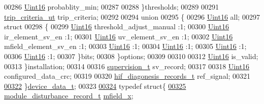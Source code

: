 \begin{DoxyCode}
00286         \hyperlink{a00004_aae7407b021d43f7193a81a58cfb3e297}{Uint16}                              probablity\_min;
00287 
00288         \}thresholds;
00289 
00291         \hyperlink{a00006_d0/d53/a00232}{trip\_criteria\_ut}                    trip\_criteria;
00292 
00294         \textcolor{keyword}{union}
00295         \{
00296            \hyperlink{a00004_aae7407b021d43f7193a81a58cfb3e297}{Uint16}                           all;
00297            \textcolor{keyword}{struct}
00298            \{
00299               \hyperlink{a00004_aae7407b021d43f7193a81a58cfb3e297}{Uint16}                        threshold\_adjust\_manual :1;
00300               \hyperlink{a00004_aae7407b021d43f7193a81a58cfb3e297}{Uint16}                        ir\_element\_sv\_en        :1;
00301               \hyperlink{a00004_aae7407b021d43f7193a81a58cfb3e297}{Uint16}                        uv\_element\_sv\_en        :1;
00302               \hyperlink{a00004_aae7407b021d43f7193a81a58cfb3e297}{Uint16}                        mfield\_element\_sv\_en    :1;
00303               \hyperlink{a00004_aae7407b021d43f7193a81a58cfb3e297}{Uint16}                                                :1;
00304               \hyperlink{a00004_aae7407b021d43f7193a81a58cfb3e297}{Uint16}                                                :1;
00305               \hyperlink{a00004_aae7407b021d43f7193a81a58cfb3e297}{Uint16}                                                :1;
00306               \hyperlink{a00004_aae7407b021d43f7193a81a58cfb3e297}{Uint16}                                                :1;
00307            \}bits;
00308         \}options;
00309 
00310 
00312         \hyperlink{a00004_aae7407b021d43f7193a81a58cfb3e297}{Uint16}                             is\_valid;
00313    \}installation;
00314 
00316     \hyperlink{a00006_de/dc2/a00228}{supervision\_t}                          sv\_record;
00317 
00318     \hyperlink{a00004_aae7407b021d43f7193a81a58cfb3e297}{Uint16}                                 configured\_data\_crc;
00319 
00320     \hyperlink{a00006_a4726b814166e222a6f13e21453f76d8d}{hif\_diagonesis\_records\_t}               ref\_signal;
00321 
\hypertarget{a00006_source_l00322}{}\hyperlink{a00006_a95029dff9c90f6a6907353ba86eb3f33}{00322} \}\hyperlink{a00006_a95029dff9c90f6a6907353ba86eb3f33}{device\_data\_t};
00323 
\hypertarget{a00006_source_l00324}{}\hyperlink{a00006}{00324}  \textcolor{keyword}{typedef} \textcolor{keyword}{struct}\{
\hypertarget{a00006_source_l00325}{}\hyperlink{a00006_a241d2538d580d57649cce4000fc4c743}{00325}     \hyperlink{a00019}{module\_disturbance\_record\_t}            \hyperlink{a00006_a241d2538d580d57649cce4000fc4c743}{mfield\_x};

\end{DoxyCode}
